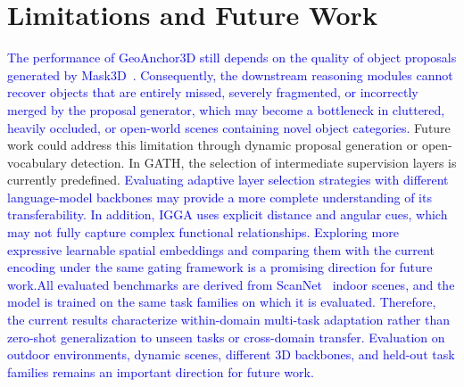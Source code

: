 \documentclass[lettersize,journal]{IEEEtran}
\begin{document}
\section{Limitations and Future Work}

\textcolor{blue}{The performance of GeoAnchor3D still depends on the quality of object proposals generated by Mask3D~\cite{mask3d2023}. Consequently, the downstream reasoning modules cannot recover objects that are entirely missed, severely fragmented, or incorrectly merged by the proposal generator, which may become a bottleneck in cluttered, heavily occluded, or open-world scenes containing novel object categories.} Future work could address this limitation through dynamic proposal generation or open-vocabulary detection. In GATH, the selection of intermediate supervision layers is currently predefined. \textcolor{blue}{Evaluating adaptive layer selection strategies with different language-model backbones may provide a more complete understanding of its transferability. In addition, IGGA uses explicit distance and angular cues, which may not fully capture complex functional relationships. Exploring more expressive learnable spatial embeddings and comparing them with the current encoding under the same gating framework is a promising direction for future work.All evaluated benchmarks are derived from ScanNet~\cite{scannet2017} indoor scenes, and the model is trained on the same task families on which it is evaluated. Therefore, the current results characterize within-domain multi-task adaptation rather than zero-shot generalization to unseen tasks or cross-domain transfer. Evaluation on outdoor environments, dynamic scenes, different 3D backbones, and held-out task families remains an important direction for future work.}
\end{document}

